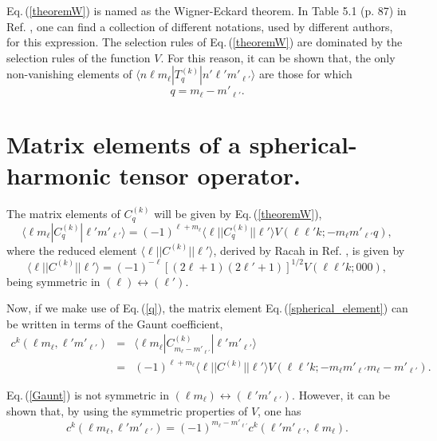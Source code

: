 \documentclass[]{interact}
\def\refe#1{{\color{blue}\textsf{Eq.}\,(\ref{#1})}}
\renewcommand{\l}{\ell}
\begin{document}
\refe{theoremW} is named as the Wigner-Eckard theorem. In Table 5.1 (p. 87) in Ref. \cite{Edmonds}, one can find a collection of different notations, used by different authors, for this expression. The selection rules of \refe{theoremW} are dominated by the selection rules of the function $V$. For this reason, it can be shown that, the only non-vanishing elements of $\langle n\l m_\l|T_{q}^{(k)}|n'\l' m'_{\l'}\rangle$  are those for which 
\begin{equation}
\label{q}
 q=m_\l-m'_{\l'}.
\end{equation}


\section{Matrix elements of a spherical-harmonic tensor operator.}

The matrix elements of $C_q^{(k)}$ will be given by \refe{theoremW},
\begin{equation}
\label{spherical_element}
 \langle \l m_\l|C_q^{(k)}|\l' m'_{\l'}\rangle = (-1)^{\l+m_\l}\langle \l ||C_q^{(k)}||\l'\rangle V(\l\l'k;-m_\l m'_{\l'}q),
\end{equation}
where the reduced element $\langle \l ||C^{(k)}||\l'\rangle$, derived by Racah in Ref. \cite{Racah}, is given by
\begin{equation}
\label{reducedC}
 \langle \l ||C^{(k)}||\l'\rangle=(-1)^{-\l}[(2\l+1)(2\l'+1)]^{1/2}V(\l\l'k;000),
\end{equation}
being symmetric in $(\l)\leftrightarrow(\l')$.

Now, if we make use of \refe{q}, the matrix element \refe{spherical_element} can be written in terms of the Gaunt coefficient,
\begin{equation}
\label{Gaunt}
\begin{array}{rcl}
  c^k(\l m_\l,\l'm'_{\l'})&=&\langle \l m_\l|C_{m_\l-m'_{\l'}}^{(k)}|\l' m'_{\l'}\rangle\\
  &=& (-1)^{\l+m_\l}\langle \l ||C^{(k)}||\l'\rangle V(\l\l'k;-m_\l m'_{\l'} m_\l-m'_{\l'}).
\end{array}
\end{equation}

\refe{Gaunt} is not symmetric in $(\l m_\l)\leftrightarrow(\l'm'_{\l'})$. However, it can be shown that, by using the symmetric properties of $V$, one has
\begin{equation}
\label{GauntS}
 c^k(\l m_\l,\l'm'_{\l'})=(-1)^{m_\l-m'_{\l'}}c^k(\l' m'_{\l'},\l m_{\l}).
\end{equation}
\end{document}
